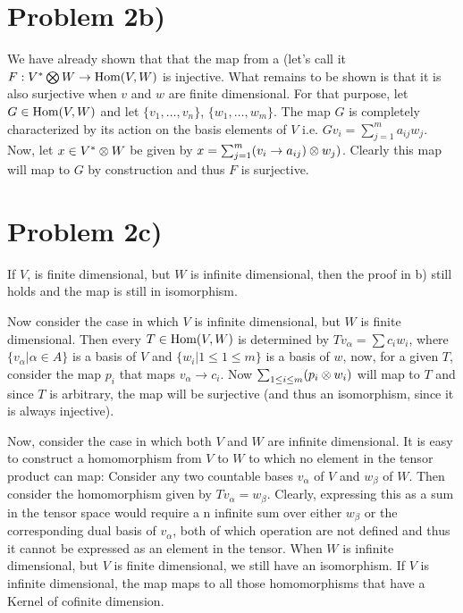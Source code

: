 \section*{Problem 2b)}
We have already shown that that the map from a (let's call it $F: V^*\bigotimes W\to \text{Hom}(V,W)$ is injective. What remains to be shown is that it is also surjective when $v$ and $w$ are finite dimensional. For that purpose, let $G\in \text{Hom}(V,W)$ and let $\{v_1,\ldots, v_n\}$, $\{w_1,\ldots,w_m\}$. The map $G$ is completely characterized by its action on the basis elements of $V$ i.e. $Gv_i = \sum_{j=1}^m a_{ij} w_j$. Now, let $x\in V^* \otimes W$ be given by $x = \sum_{j=1}^m (v_i \to a_{ij})\otimes w_j)$. Clearly this map will map to $G$ by construction and thus $F$ is surjective. 
\section*{Problem 2c)}
If $V$, is finite dimensional, but $W$ is infinite dimensional, then the proof in b) still holds and the map is still in isomorphism. \par 
Now consider the case in which $V$ is infinite dimensional, but $W$ is finite dimensional. Then every $T\in \text{Hom}(V,W)$ is determined by $T v_\alpha = \sum c_i w_i$, where $\{v_\alpha | \alpha\in A\}$ is a basis of $V$ and $\{w_i | 1\leq 1 \leq m \}$ is a basis of $w$, now, for a given $T$, consider the map $p_i$ that maps $v_\alpha \to c_i$. Now $\sum_{1\leq i \leq m} (p_i \otimes w_i)$ will map to $T$ and since $T$ is arbitrary, the map will be surjective (and thus an isomorphism, since it is always injective). \par 
Now, consider the case in which both $V$ and $W$ are infinite dimensional. It is easy to construct a homomorphism from $V$ to $W$ to which no element in the tensor product can map: Consider any two countable bases $v_\alpha$ of $V$ and $w_\beta$ of $W$.
Then consider the homomorphism given by $Tv_\alpha = w_\beta$. Clearly, expressing this as a sum in the tensor space would require a n infinite sum over either $w_\beta$ or the corresponding dual basis of $v_\alpha$, both of which operation are not defined and thus it cannot be expressed as an element in the tensor.
When $W$ is infinite dimensional, but $V$ is finite dimensional, we still have an isomorphism. If $V$ is infinite dimensional, the map maps to all those homomorphisms that have a Kernel of cofinite dimension.
